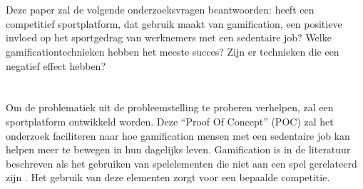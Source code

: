 
\section{}%
\label{sec:onderzoeksvraag}


Deze paper zal de volgende onderzoeksvragen beantwoorden: heeft een competitief sportplatform, dat gebruik maakt van gamification, een positieve invloed op het sportgedrag van werknemers met een sedentaire job? Welke gamificationtechnieken hebben het meeste succes? Zijn er technieken die een negatief effect hebben?

\section{}%
\label{sec:onderzoeksdoelstelling}

Om de problematiek uit de probleemstelling te proberen verhelpen, zal een \linebreak sportplatform ontwikkeld worden. Deze ``Proof Of Concept'' (POC) zal het onderzoek faciliteren naar hoe gamification mensen met een sedentaire job kan helpen meer te bewegen in hun dagelijks leven. Gamification is in de literatuur beschreven als het gebruiken van spelelementen die niet aan een spel gerelateerd zijn \autocite{Gaalen2020}. Het gebruik van deze elementen zorgt voor een bepaalde competitie.

